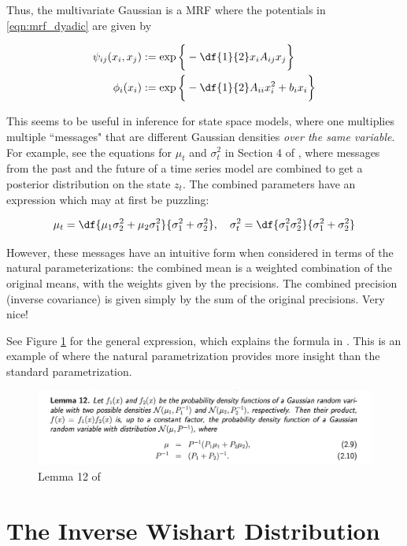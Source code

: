 \documentclass{article} %
\newcommand{\selfpotential}{\phi}
\newcommand{\edgepotential}{\psi}
\begin{document}
Thus, the multivariate Gaussian is a MRF where the potentials in \eqref{eqn:mrf_dyadic} are given by

\begin{align*}
\edgepotential_{ij}(x_i, x_j) & := \exp \bigg\{ -\df{1}{2} x_i A_{ij} x_j \bigg\}  \\
\selfpotential_{i}(x_i) & := \exp \bigg\{ -\df{1}{2} A_{ii} x_i^2 + b_i x_i \bigg\}  
\end{align*}

This seems to be useful in inference for state space models, where one multiplies multiple ``messages" that are different Gaussian densities \textit{over the same variable}.   For example, see  the equations for $\mu_t$ and $\sigma^2_t$ in Section 4 of \cite{krishnan2016structured}, where messages from the past and the future of a time series model are combined to get a posterior distribution on the state $z_t$.   The combined parameters have an expression which may at first be puzzling:

\[ \mu_t = \df{\mu_1 \sigma^2_2 + \mu_2 \sigma^2_1}{\sigma^2_1 + \sigma^2_2}  , \quad \sigma^2_t = \df{\sigma^2_1 \sigma^2_2}{ \sigma^2_1 + \sigma^2_2} \]

However, these messages have an intuitive form when considered in terms of the natural parameterizations:  the combined mean is a weighted combination of the original means, with the weights given by the precisions.   The combined precision (inverse covariance) is given simply by the sum of the original precisions.  Very nice! 

 See Figure \ref{fig:lemma_twelve_bickson} for the general expression, which explains the formula in  \cite{krishnan2016structured}.  This is an example of where the natural parametrization provides more insight than the standard parametrization. 

\begin{figure}[H]
\includegraphics[width=\textwidth]{images/bickson_lemma_12}
\caption{Lemma 12 of \cite{bickson2008gaussian}}
\label{fig:lemma_twelve_bickson}
\end{figure}

\section{The Inverse Wishart Distribution} \label{sec:inverse_wishart_distribution}
 
\end{document}
